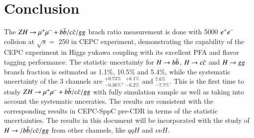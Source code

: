 \section{Conclusion}\label{sec:summary}
The $ZH\rightarrow \mu^{+}\mu^{-} + b\bar{b}/c\bar{c}/gg$ brach ratio measurement is done with 5000 \ifb $e^{+}e^{-}$ collsion at $\sqrt{s} = $ 250 \GeV in CEPC experiment, demonstrating the capability of the CEPC experiment in Higgs yukawa coupling with its excellent PFA and flavor tagging performance. 
The statistic uncertainty for $H\rightarrow b\bar{b}$, $H\rightarrow c\bar{c}$ and $H\rightarrow gg$ branch fraction is esitmated as 1.1\%, 10.5\% and 5.4\%, while the systematic uncertainty of the 3 channels are $^{+0.73\%}_{-0.36\%}$, $^{+6.1\%}_{-6.2\%}$ and $^{7.6\%}_{-7.7\%}$. This is the first time to study $ZH\rightarrow \mu^{+}\mu^{-} + b\bar{b}/c\bar{c}/gg$ with fully 
simulation sample as well as taking into account the systematic unceraties. The results are consistent with the corresponding results in CEPC-SppC pre-CDR\cite{CEPC_preCDR} in terms of the statistic uncertainties. The results in this document will be incorporated with 
the study of $H\rightarrow/b\bar{b}/c\bar{c}/gg$ from other channels, like $qqH$ and $\nu\nu H$.\par
